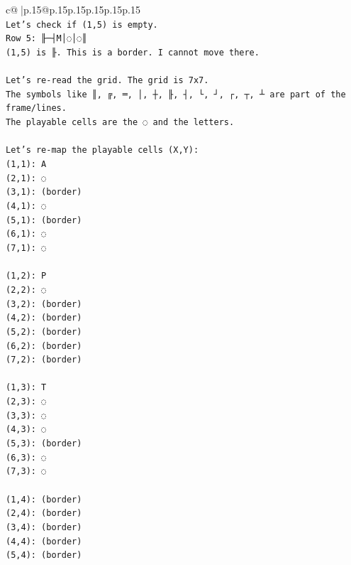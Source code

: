 \documentclass{article}
\begin{document}
{\begin{supertabular}{c@{$\;$}|p{.15\linewidth}@{}p{.15\linewidth}p{.15\linewidth}p{.15\linewidth}p{.15\linewidth}p{.15\linewidth}}
{{{\\ 
\texttt{Let's check if (1,5) is empty.} \\
\texttt{Row 5: ╟─┤M│◌│◌║} \\
\texttt{(1,5) is ╟. This is a border. I cannot move there.} \\
\\ 
\texttt{Let's re{-}read the grid. The grid is 7x7.} \\
\texttt{The symbols like ║, ╔, ═, │, ┼, ╟, ┤, └, ┘, ┌, ┬, ┴ are part of the frame/lines.} \\
\texttt{The playable cells are the ◌ and the letters.} \\
\\ 
\texttt{Let's re{-}map the playable cells (X,Y):} \\
\texttt{(1,1): A} \\
\texttt{(2,1): ◌} \\
\texttt{(3,1): (border)} \\
\texttt{(4,1): ◌} \\
\texttt{(5,1): (border)} \\
\texttt{(6,1): ◌} \\
\texttt{(7,1): ◌} \\
\\ 
\texttt{(1,2): P} \\
\texttt{(2,2): ◌} \\
\texttt{(3,2): (border)} \\
\texttt{(4,2): (border)} \\
\texttt{(5,2): (border)} \\
\texttt{(6,2): (border)} \\
\texttt{(7,2): (border)} \\
\\ 
\texttt{(1,3): T} \\
\texttt{(2,3): ◌} \\
\texttt{(3,3): ◌} \\
\texttt{(4,3): ◌} \\
\texttt{(5,3): (border)} \\
\texttt{(6,3): ◌} \\
\texttt{(7,3): ◌} \\
\\ 
\texttt{(1,4): (border)} \\
\texttt{(2,4): (border)} \\
\texttt{(3,4): (border)} \\
\texttt{(4,4): (border)} \\
\texttt{(5,4): (border)} \\
}}}
\end{supertabular}}
\end{document}
